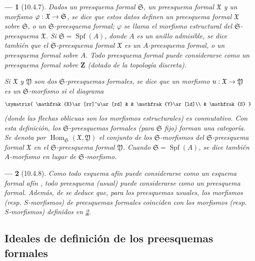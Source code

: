 \documentclass[oneside]{amsart}
\theoremstyle{ega-env-style}
\newtheorem*{env}{---}
\theoremstyle{ega-thm-env-style}
\theoremstyle{ega-defn-env-style}
\renewcommand{\to}{\mathchoice{\longrightarrow}{\rightarrow}{\rightarrow}{\rightarrow}}
\let\EGAOriginalLabel\label
\renewcommand{\label}[1]{\phantomsection\EGAOriginalLabel{#1}}
\begin{document}
\begin{env}[10.4.7]
\label{I.10.4.7}
Dados un preesquema formal $\mathfrak{S}$, un preesquema formal $\mathfrak{X}$ y un morfismo $\varphi:\mathfrak{X}\to\mathfrak{S}$, se dice que estos datos definen un preesquema formal \emph{$\mathfrak{X}$ sobre $\mathfrak{S}$}, o un \emph{$\mathfrak{S}$-preesquema formal}; $\varphi$ se llama el \emph{morfismo estructural} del $\mathfrak{S}$-preesquema $\mathfrak{X}$.
Si $\mathfrak{S}=\operatorname{Spf}(A)$, donde $A$ es un anillo admisible, se dice también que el $\mathfrak{S}$-preesquema formal $\mathfrak{X}$ es un \emph{$A$-preesquema formal}, o un preesquema formal \emph{sobre $A$}.
Todo preesquema formal puede considerarse como un preesquema formal sobre $\mathbf{Z}$ (dotado de la topología discreta).

Si $\mathfrak{X}$ y $\mathfrak{Y}$ son dos $\mathfrak{S}$-preesquemas formales, se dice que un morfismo $u:\mathfrak{X}\to\mathfrak{Y}$ es un \emph{$\mathfrak{S}$-morfismo} si el diagrama
\[
  \xymatrix{
    \mathfrak{X}\ar[rr]^u\ar[rd] & &
    \mathfrak{Y}\ar[ld]\\
    & \mathfrak{S}
  }
\]
(donde las flechas oblicuas son los morfismos estructurales) es conmutativo.
Con esta definición, los $\mathfrak{S}$-preesquemas formales (para $\mathfrak{S}$ fijo) forman una \emph{categoría}.
Se denota por $\operatorname{Hom}_{\mathfrak{S}}(\mathfrak{X},\mathfrak{Y})$ el conjunto de los $\mathfrak{S}$-morfismos del $\mathfrak{S}$-preesquema formal $\mathfrak{X}$ en el $\mathfrak{S}$-preesquema formal $\mathfrak{Y}$.
Cuando $\mathfrak{S}=\operatorname{Spf}(A)$, se dice también \emph{$A$-morfismo} en lugar de \emph{$\mathfrak{S}$-morfismo}.
\end{env}

\begin{env}[10.4.8]
\label{I.10.4.8}
Como todo esquema afín puede considerarse como un esquema formal afín , todo preesquema (usual) puede considerarse como un preesquema formal.
Además, de  se deduce que, para los preesquemas \emph{usuales}, los morfismos (resp. $S$-morfismos) de preesquemas \emph{formales} coinciden con los morfismos (resp. $S$-morfismos) definidos en \textsection\hyperref[section:I.2]{2}.
\end{env}

\subsection{Ideales de definición de los preesquemas formales}
\label{subsection:I.10.5}
\end{document}
